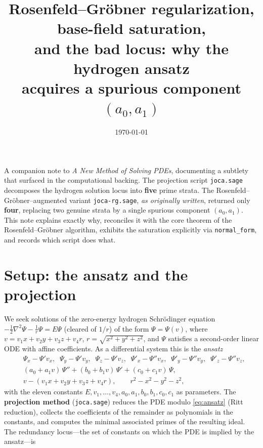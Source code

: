 \documentclass[11pt]{article}
\title{Rosenfeld--Gr\"obner regularization, base-field saturation,\\
       and the bad locus: why the hydrogen ansatz\\ acquires a spurious
       component $(a_0,a_1)$}
\author{}
\date{\today}
\newcommand{\code}[1]{\texttt{#1}}
\begin{document}
\maketitle

\noindent
A companion note to \emph{A New Method of Solving PDEs}, documenting a subtlety
that surfaced in the computational backing. The projection script
\code{joca.sage} decomposes the hydrogen solution locus into \textbf{five}
prime strata. The Rosenfeld--Gr\"obner--augmented variant \code{joca-rg.sage},
\emph{as originally written}, returned only \textbf{four}, replacing two genuine
strata by a single spurious component $(a_0,a_1)$. This note explains exactly
why, reconciles it with the core theorem of the Rosenfeld--Gr\"obner algorithm,
exhibits the saturation explicitly via \code{normal\_form}, and records which
script does what.

\section{Setup: the ansatz and the projection}

We seek solutions of the zero-energy hydrogen Schr\"odinger equation
$-\tfrac12\nabla^2\Psi-\tfrac1r\Psi=E\Psi$ (cleared of $1/r$) of the form
$\Psi=\Psi(v)$, where $v=v_1x+v_2y+v_3z+v_4r$, $r=\sqrt{x^2+y^2+z^2}$, and $\Psi$
satisfies a second-order linear ODE with affine coefficients. As a differential
system this is the \emph{ansatz}
\begin{equation}
\label{eq:ansatz}
\begin{aligned}
  &\Psi_x-\Psi' v_x,\;\; \Psi_y-\Psi' v_y,\;\; \Psi_z-\Psi' v_z,\;\;
   \Psi'_x-\Psi'' v_x,\;\; \Psi'_y-\Psi'' v_y,\;\; \Psi'_z-\Psi'' v_z,\\
  &\boxed{(a_0+a_1v)\,\Psi'' + (b_0+b_1v)\,\Psi' + (c_0+c_1v)\,\Psi},\\
  &v-(v_1x+v_2y+v_3z+v_4r),\qquad r^2-x^2-y^2-z^2,
\end{aligned}
\end{equation}
with the eleven constants $E,v_1,\dots,v_4,a_0,a_1,b_0,b_1,c_0,c_1$ as
parameters. The \textbf{projection method} (\code{joca.sage}) reduces the PDE
modulo \eqref{eq:ansatz} (Ritt reduction), collects the coefficients of the
remainder as polynomials in the constants, and computes the minimal associated
primes of the resulting ideal. The redundancy locus---the set of constants on
which the PDE is implied by the ansatz---is
\end{document}
